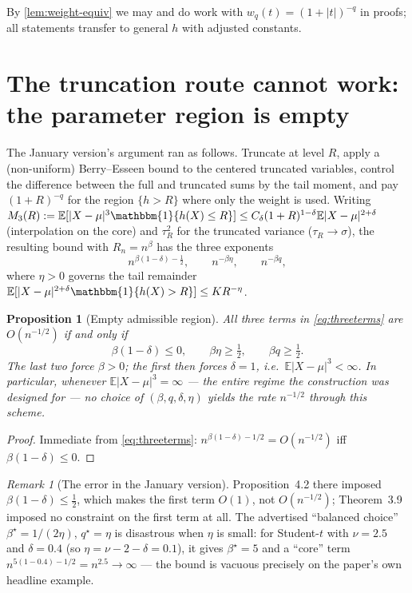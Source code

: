 \documentclass[11pt,a4paper]{article}
\theoremstyle{plain}
\newtheorem{proposition}[theorem]{Proposition}
\theoremstyle{definition}
\theoremstyle{remark}
\newtheorem{remark}[theorem]{Remark}
\numberwithin{equation}{section}
\newcommand{\E}{\mathbb{E}}
\newcommand{\1}{\mathbbm{1}}
\newcommand{\h}{h}
\begin{document}
By \cref{lem:weight-equiv} we may and do work with $w_q(t)=(1+|t|)^{-q}$ in proofs; all
statements transfer to general $\h$ with adjusted constants.

\section{The truncation route cannot work: the parameter region is empty}
\label{sec:empty}

The January version's argument ran as follows. Truncate at level $R$, apply a
(non-uniform) Berry--Esseen bound to the centered truncated variables, control the
difference between the full and truncated sums by the tail moment, and pay
$(1+R)^{-q}$ for the region $\{\h>R\}$ where only the weight is used. Writing
$M_3(R):=\E[|X-\mu|^3\1\{\h(X)\le R\}]\le C_\delta(1+R)^{1-\delta}\E|X-\mu|^{2+\delta}$
(interpolation on the core) and $\tau_R^2$ for the truncated variance
($\tau_R\to\sigma$), the resulting bound with $R_n=n^\beta$ has the three exponents
\begin{equation}\label{eq:threeterms}
n^{\beta(1-\delta)-\frac12},\qquad n^{-\beta\eta},\qquad n^{-\beta q},
\end{equation}
where $\eta>0$ governs the tail remainder
$\E[|X-\mu|^{2+\delta}\1\{\h(X)>R\}]\le KR^{-\eta}$.

\begin{proposition}[Empty admissible region]\label{prop:empty}
All three terms in \eqref{eq:threeterms} are $O(n^{-1/2})$ if and only if
\[
\beta(1-\delta)\le 0,\qquad \beta\eta\ge\tfrac12,\qquad \beta q\ge\tfrac12 .
\]
The last two force $\beta>0$; the first then forces $\delta=1$, i.e.\
$\E|X-\mu|^3<\infty$. In particular, whenever $\E|X-\mu|^3=\infty$ --- the entire
regime the construction was designed for --- no choice of $(\beta,q,\delta,\eta)$
yields the rate $n^{-1/2}$ through this scheme.
\end{proposition}

\begin{proof}
Immediate from \eqref{eq:threeterms}: $n^{\beta(1-\delta)-1/2}=O(n^{-1/2})$ iff
$\beta(1-\delta)\le0$.
\end{proof}

\begin{remark}[The error in the January version]\label{rem:arith}
Proposition~4.2 there imposed $\beta(1-\delta)\le\frac12$, which makes the first term
$O(1)$, not $O(n^{-1/2})$; Theorem~3.9 imposed no constraint on the first term at all.
The advertised ``balanced choice'' $\beta^\star=1/(2\eta)$, $q^\star=\eta$ is
disastrous when $\eta$ is small: for Student-$t$ with $\nu=2.5$ and $\delta=0.4$
(so $\eta=\nu-2-\delta=0.1$), it gives $\beta^\star=5$ and a ``core'' term
$n^{5(1-0.4)-1/2}=n^{2.5}\to\infty$ --- the bound is vacuous precisely on the paper's
own headline example.
\end{remark}
\end{document}
